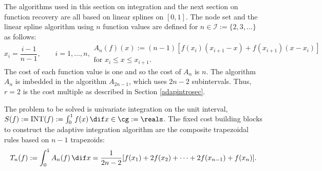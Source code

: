 The algorithms used in this section on integration and the next section on function recovery are all based on linear splines on $[0,1]$.  The node set and the linear spline algorithm using $n$ function values are defined for $n \in \mathcal{I}:=\{2,3,\ldots\}$ as follows:
\begin{subequations} \label{linearspline}
\begin{equation}
x_i=\frac{i-1}{n-1}, \qquad i=1, \ldots, n,
\end{equation}
\begin{multline}
A_{n}(f)(x):=(n-1) \left[ f(x_{i})(x_{i+1}-x) +f(x_{i+1})(x-x_i) \right] \\ \text{for }x_i \leq x \leq x_{i+1}.
\end{multline}
\end{subequations}
The cost of each function value is one and so the cost of  $A_n$ is $n$. The algorithm $A_n$ is imbedded in the algorithm $A_{2n-1}$, which uses $2n-2$ subintervals.  Thus, $r=2$ is the cost multiple as described in Section \ref{adapintrosec}.

The problem to be solved is univariate integration on the unit interval, $S(f):=\INT(f):=\int_{0}^{1}f(x) \, \dif x \in \cg := \reals$.  The fixed cost building blocks to construct the adaptive integration algorithm are the composite trapezoidal rules based on $n-1$ trapezoids:
\begin{equation*}
    T_{n}(f) := \int_0^1 A_n(f) \, \dif x
    =\frac{1}{2n-2}[f(x_1)+2f(x_2)+\cdots+2f(x_{n-1})+f(x_n)].
\end{equation*}


